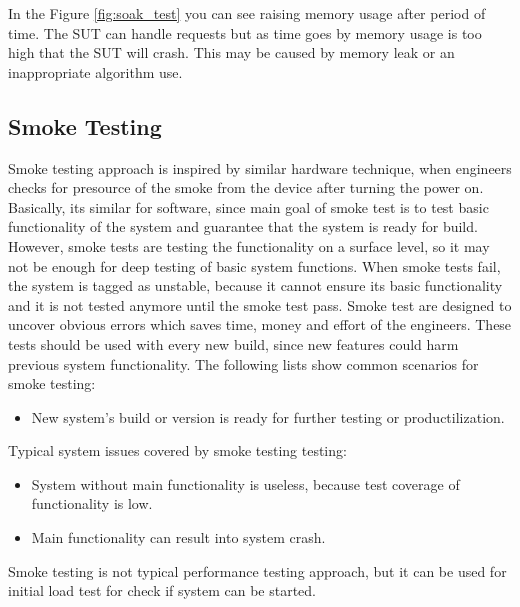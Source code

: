 In the Figure \ref{fig:soak_test} you can see raising memory usage after period of time. The SUT can handle requests but as time goes by memory usage is too high that the SUT will crash. This may be caused by memory leak or an inappropriate algorithm use.

\subsection*{Smoke Testing}
Smoke testing approach is inspired by similar hardware technique, when engineers checks for presource of the smoke from the device after turning the power on. Basically, its similar for software, since main goal of smoke test is to test basic functionality of the system and guarantee that the system is ready for build. However, smoke tests are testing the functionality on a surface level, so it may not be enough for deep testing of basic system functions. When smoke tests fail, the system is tagged as unstable, because it cannot ensure its basic functionality and it is not tested anymore until the smoke test pass. Smoke test are designed to uncover obvious errors which saves time, money and effort of the engineers. These tests should be used with every new build, since new features could harm previous system functionality.
The following lists show common scenarios for smoke testing:
\begin{itemize}
	\setlength\itemsep{0em}
	\item New system's build or version is ready for further testing or productilization.
\end{itemize}
Typical system issues covered by smoke testing testing:
\begin{itemize}
	\setlength\itemsep{0em}
	\item System without main functionality is useless, because test coverage of functionality is low.
	\item Main functionality can result into system crash.
\end{itemize}

Smoke testing is not typical performance testing approach, but it can be used for initial load test for check if system can be started.


